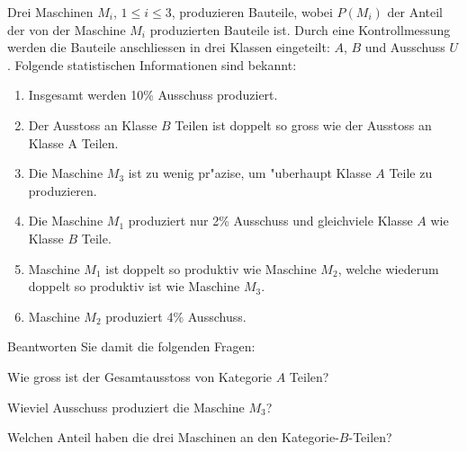 Drei Maschinen $M_i$, $1\le i\le 3$, produzieren Bauteile, wobei $P(M_i)$
der Anteil der von der Maschine $M_i$ produzierten Bauteile ist.
Durch eine Kontrollmessung werden die Bauteile anschliessen in
drei Klassen eingeteilt: $A$, $B$ und Ausschuss $U$. Folgende statistischen
Informationen sind bekannt:
\begin{enumerate}
\item Insgesamt werden 10\% Ausschuss produziert.
\item Der Ausstoss an Klasse $B$ Teilen ist doppelt so gross wie
der Ausstoss an Klasse A Teilen.
\item Die Maschine $M_3$ ist zu wenig pr"azise, um "uberhaupt
Klasse $A$ Teile zu produzieren.
\item Die Maschine $M_1$ produziert nur 2\% Ausschuss und gleichviele
Klasse $A$ wie Klasse $B$ Teile.
\item Maschine $M_1$ ist doppelt so produktiv wie Maschine $M_2$, welche
wiederum doppelt so produktiv ist wie Maschine $M_3$.
\item Maschine $M_2$ produziert 4\% Ausschuss.
\end{enumerate}
Beantworten Sie damit die folgenden Fragen:
\begin{teilaufgaben}
\item
Wie gross ist der Gesamtausstoss von Kategorie $A$ Teilen?
\item
Wieviel Ausschuss produziert die Maschine $M_3$?
\item
Welchen Anteil haben die drei Maschinen an den Kategorie-$B$-Teilen?
\end{teilaufgaben}

